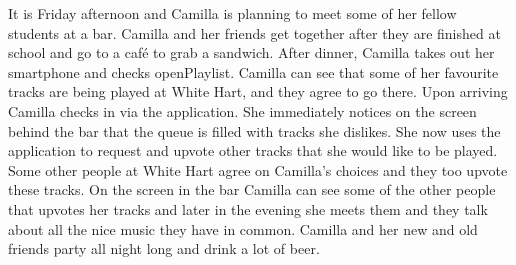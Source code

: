 It is Friday afternoon and Camilla is planning to meet some of her fellow students at a bar. Camilla and her friends get together after they are finished at school and go to a café to grab a sandwich. After dinner, Camilla takes out her smartphone and checks openPlaylist. Camilla can see that some of her favourite tracks are being played at White Hart, and they agree to go there. Upon arriving Camilla checks in via the application. She immediately notices on the screen behind the bar that the queue is filled with tracks she dislikes. She now uses the application to request and upvote other tracks that she would like to be played. Some other people at White Hart agree on Camilla's choices and they too upvote these tracks. On the screen in the bar Camilla can see some of the other people that upvotes her tracks and later in the evening she meets them and they talk about all the nice music they have in common. Camilla and her new and old friends party all night long and drink a lot of beer.
